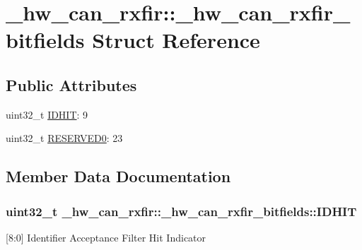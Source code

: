 \hypertarget{struct__hw__can__rxfir_1_1__hw__can__rxfir__bitfields}{}\section{\+\_\+hw\+\_\+can\+\_\+rxfir\+:\+:\+\_\+hw\+\_\+can\+\_\+rxfir\+\_\+bitfields Struct Reference}
\label{struct__hw__can__rxfir_1_1__hw__can__rxfir__bitfields}
\subsection*{Public Attributes}
\begin{DoxyCompactItemize}
\item 
uint32\+\_\+t \hyperlink{struct__hw__can__rxfir_1_1__hw__can__rxfir__bitfields_ad2625be0dfb167d2dbc3a6917bbd3166}{I\+D\+H\+IT}\+: 9
\item 
uint32\+\_\+t \hyperlink{struct__hw__can__rxfir_1_1__hw__can__rxfir__bitfields_a785dc57554ca5fef23014add10eeaf10}{R\+E\+S\+E\+R\+V\+E\+D0}\+: 23
\end{DoxyCompactItemize}


\subsection{Member Data Documentation}
\subsubsection[{\texorpdfstring{I\+D\+H\+IT}{IDHIT}}]{\setlength{\rightskip}{0pt plus 5cm}uint32\+\_\+t \+\_\+hw\+\_\+can\+\_\+rxfir\+::\+\_\+hw\+\_\+can\+\_\+rxfir\+\_\+bitfields\+::\+I\+D\+H\+IT}\hypertarget{struct__hw__can__rxfir_1_1__hw__can__rxfir__bitfields_ad2625be0dfb167d2dbc3a6917bbd3166}{}\label{struct__hw__can__rxfir_1_1__hw__can__rxfir__bitfields_ad2625be0dfb167d2dbc3a6917bbd3166}
\mbox{[}8\+:0\mbox{]} Identifier Acceptance Filter Hit Indicator 

